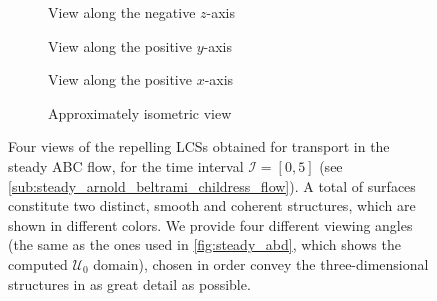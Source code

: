 \begin{figure}[htpb]
    \centering
    \hspace*{\fill}
    \begin{subfigure}[b]{0.42\textwidth}
        \centering
        \caption[]{{\small View along the negative $z$-axis}}
        \label{fig:steady_lcss_z}
    \end{subfigure}\hfill%
    \begin{subfigure}[b]{0.42\textwidth}
        \centering
        \caption[]{{\small View along the positive $y$-axis}}
        \label{fig:steady_lcss_y}
    \end{subfigure}%
    \hspace*{\fill}

    \hspace*{\fill}
    \begin{subfigure}[b]{0.42\textwidth}
        \centering
        \caption[]{{\small View along the positive $x$-axis}}
        \label{fig:steady_lcss_x}
    \end{subfigure}\hfill%
    \begin{subfigure}[b]{0.42\textwidth}
        \centering
        \caption[]{{\small Approximately isometric view}}
        \label{fig:steady_lcss_isometric}
    \end{subfigure}%
    \hspace*{\fill}
    \caption[Four views of the repelling LCSs obtained for transport in the
    steady ABC flow]
    {
        Four views of the repelling LCSs obtained for transport in the steady
        ABC flow, for the time interval $\mathcal{I}=[0,5]$ (see
        \cref{sub:steady_arnold_beltrami_childress_flow}). A total of
         surfaces constitute two distinct, smooth and coherent
        structures, which are shown in different colors. We provide four
        different viewing angles (the same as the ones used in
        \cref{fig:steady_abd}, which shows the computed $\mathcal{U}_{0}$
        domain), chosen in order convey the three-dimensional structures in as
        great detail as possible.
}
    \label{fig:steady_lcss}
\end{figure}

